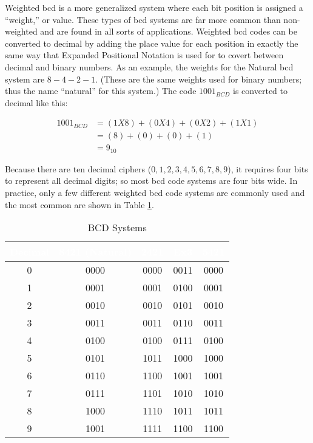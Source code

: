 Weighted \gls{bcd} is a more generalized system where each bit position is assigned a ``weight,'' or value. These types of \gls{bcd} systems are far more common than non-weighted and are found in all sorts of applications. Weighted \gls{bcd} codes can be converted to decimal by adding the place value for each position in exactly the same way that Expanded Positional Notation is used for to covert between decimal and binary numbers. As an example, the weights for the Natural \gls{bcd} system are $ 8-4-2-1 $. (These are the same weights used for binary numbers; thus the name ``natural'' for this system.) The code $ 1001_{BCD} $ is converted to decimal like this: 

\begin{align}
  1001_{BCD} &= (1X8)+(0X4)+(0X2)+(1X1) \\
  \nonumber
  &= (8)+(0)+(0)+(1) \\
  \nonumber
  &= 9_{10}
\end{align}

Because there are ten decimal ciphers ($ 0, 1, 2, 3, 4, 5, 6, 7, 8, 9 $), it requires four bits to represent all decimal digits; so most \gls{bcd} code systems are four bits wide. In practice, only a few different weighted \gls{bcd} code systems are commonly used and the most common are shown in Table \ref{MO:tab:bcd_systems}. 

\begin{table}[H]
  \sffamily
  \newcommand{\head}[1]{\textcolor{white}{\textbf{#1}}}    
  \begin{center}
    \begin{tabular}{ c c c c c } 
      \hline
      \rowcolor{black!75}
      {\head{Decimal}} & {\head{8421 (Natural)}} & \head{2421} 
      & \head{Ex3} & \head{5421} \\
      \hline    
      0 & 0000 & 0000 & 0011 & 0000 \\
      1 & 0001 & 0001 & 0100 & 0001 \\
      2 & 0010 & 0010 & 0101 & 0010 \\
      3 & 0011 & 0011 & 0110 & 0011 \\
      4 & 0100 & 0100 & 0111 & 0100 \\
      5 & 0101 & 1011 & 1000 & 1000 \\
      6 & 0110 & 1100 & 1001 & 1001 \\
      7 & 0111 & 1101 & 1010 & 1010 \\
      8 & 1000 & 1110 & 1011 & 1011 \\
      9 & 1001 & 1111 & 1100 & 1100 \\
      \hline  
    \end{tabular}
  \end{center}
  \caption{BCD Systems}
  \label{MO:tab:bcd_systems}
\end{table}


